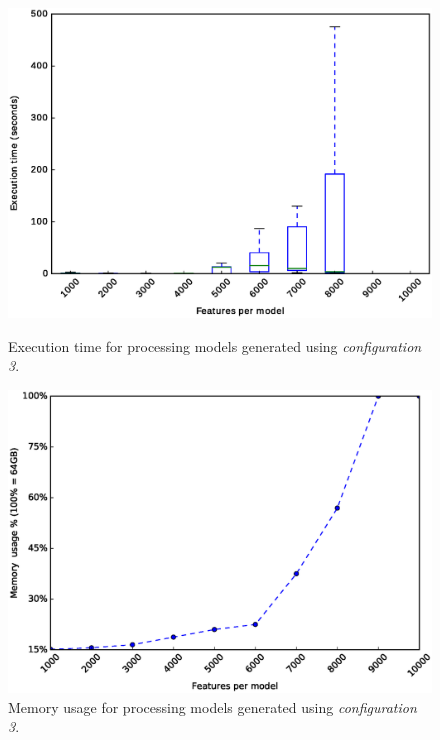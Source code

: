 \begin{figure}[h]
        \centering
        \begin{minipage}[b]{0.48\textwidth}
                \includegraphics[width=\textwidth]{boxplot_0_5.eps}
                \caption{Execution time for processing models generated using \textit{configuration 3}.}\label{fig:plot:probs:boxplot_0_5}
        \end{minipage}
        \hfill
        \begin{minipage}[b]{0.48\textwidth}
                \includegraphics[width=\textwidth]{boxplot_0_5_mem.eps}
                \caption{Memory usage for processing models generated using \textit{configuration 3}.}\label{fig:plot:probs:boxplot_0_5_mem}
        \end{minipage}
\end{figure}


